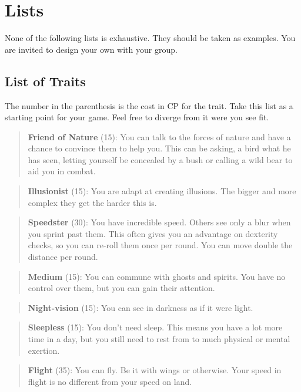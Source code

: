 \documentclass[11pt]{article}
\begin{document}
{\section{Lists}
\label{sec:org0571e55}
None of the following lists is exhaustive. They should be taken as examples. You are invited to design your own with your group.
\subsection{List of Traits}
\label{sec:orge17e5e7}
The number in the parenthesis is the cost in CP for the trait. Take this list as a starting point for your game. Feel free to diverge from it were you see fit.

\begin{quote}
\textbf{Friend of Nature} (15): You can talk to the forces of nature and have a chance to convince them to help you. This can be asking, a bird what he has seen, letting yourself be concealed by a bush or calling a wild bear to aid you in combat.
\end{quote}

\begin{quote}
\textbf{Illusionist} (15): You are adapt at creating illusions. The bigger and more complex they get the harder this is.
\end{quote}

\begin{quote}
\textbf{Speedster} (30): You have incredible speed. Others see only a blur when you sprint past them. This often gives you an advantage on dexterity checks, so you can re-roll them once per round. You can move double the distance per round.
\end{quote}

\begin{quote}
\textbf{Medium} (15): You can commune with ghosts and spirits. You have no control over them, but you can gain their attention.
\end{quote}

\begin{quote}
\textbf{Night-vision} (15): You can see in darkness as if it were light.
\end{quote}

\begin{quote}
\textbf{Sleepless} (15): You don't need sleep. This means you have a lot more time in a day, but you still need to rest from to much physical or mental exertion.
\end{quote}

\begin{quote}
\textbf{Flight} (35): You can fly. Be it with wings or otherwise. Your speed in flight is no different from your speed on land.
\end{quote}

}
\end{document}
